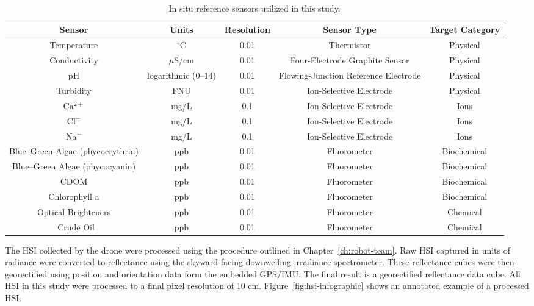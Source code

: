 \clearpage
\newpage

\begin{sidewaystable}
  \caption{In situ reference sensors utilized in this study.}
  \label{tab:sensors}
  \begin{center}
    \begin{tabular}{ccccc} \hline
      \textbf{Sensor}	& \textbf{Units} & \textbf{Resolution} & \textbf{Sensor Type} & \textbf{Target Category}\\ \hline
      Temperature & $^{\circ}$C & 0.01 & Thermistor & Physical \\
      Conductivity & $\mu$S/cm & 0.01 & Four-Electrode Graphite Sensor & Physical  \\
      pH & logarithmic (0--14) & 0.01 & Flowing-Junction Reference Electrode & Physical \\
      Turbidity & FNU & 0.01 & Ion-Selective Electrode & Physical \\
      $\mathrm{Ca^{2+}}$ & mg/L & 0.1 & Ion-Selective Electrode & Ions \\
      $\mathrm{Cl^-}$ & mg/L & 0.1 & Ion-Selective Electrode & Ions \\
      $\mathrm{Na^+}$ & mg/L & 0.1 & Ion-Selective Electrode & Ions \\
      Blue--Green Algae (phycoerythrin) & ppb & 0.01 & Fluorometer & Biochemical \\
      Blue--Green Algae (phycocyanin) & ppb & 0.01  & Fluorometer & Biochemical \\
      CDOM & ppb & 0.01 & Fluorometer & Biochemical \\
      Chlorophyll a & ppb & 0.01 & Fluorometer & Biochemical \\
      Optical Brighteners & ppb & 0.01 & Fluorometer & Chemical \\\
      Crude Oil & ppb & 0.01 & Fluorometer & Chemical
    \end{tabular}
  \end{center}
\end{sidewaystable}

\clearpage
\newpage


The HSI collected by the drone were processed using the procedure outlined in
Chapter~\ref{ch:robot-team}. Raw HSI captured in units of radiance were converted
to reflectance using the skyward-facing downwelling irradiance spectrometer. These
reflectance cubes were then georectified using position and orientation data form
the embedded GPS/IMU. The final result is a georectified reflectance data cube.
All HSI in this study were processed to a final pixel resolution of 10 cm.
Figure~\ref{fig:hsi-infographic} shows an annotated example of a processed HSI.

